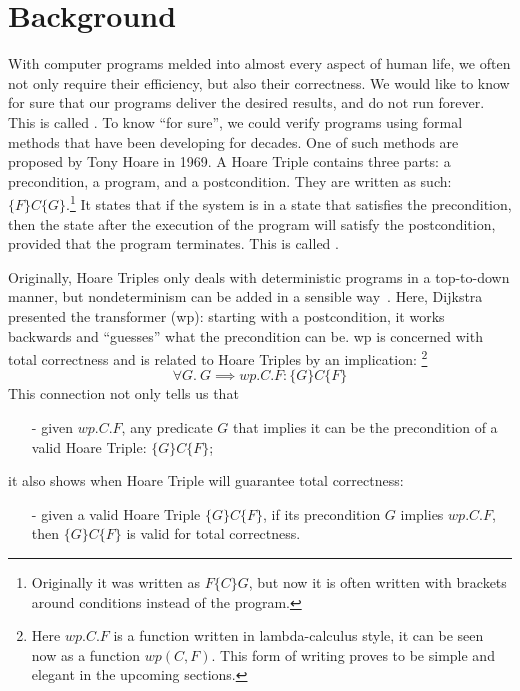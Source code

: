 \chapter{Background}\label{ch:background}

With computer programs melded into almost every aspect of human life, we often not only require their efficiency, but also their correctness. 
We would like to know for sure that our programs deliver the desired results, and do not run forever. 
This is called . 
To know ``for sure'', we could verify programs using formal methods that have been developing for decades. 
One of such methods are ~\cite{Hoare1969} proposed by Tony Hoare in 1969. 
A Hoare Triple contains three parts: a precondition, a program, and a postcondition. 
They are written as such: $\{F\}C\{G\}$.\footnote{Originally it was written as $F \{C\} G$, but now it is often written with brackets around conditions instead of the program.} 
It states that if the system is in a state that satisfies the precondition, then the state after the execution of the program will satisfy the postcondition, provided that the program terminates.
This is called . 

Originally, Hoare Triples only deals with deterministic programs in a top-to-down manner, but nondeterminism can be added in a sensible way~\cite{Dijkstra1975}. 
Here, Dijkstra presented the  transformer (wp): starting with a postcondition, it works backwards and ``guesses'' what the precondition can be. 
wp is concerned with total correctness and is related to Hoare Triples by an implication: 
\footnote{Here $wp.C.F$ is a function written in lambda-calculus style, it can be seen now as a function $wp(C,F)$. This form of writing proves to be simple and elegant in the upcoming sections.}
\[\forall G.\ G\implies wp.C.F: \{G\} C \{F\}\]
This connection not only tells us that 
\begin{itemize}
    \item[-] given $wp.C.F$, any predicate $G$ that implies it can be the precondition of a valid Hoare Triple: $\{G\} C \{F\}$; 
\end{itemize}
it also shows when Hoare Triple will guarantee total correctness: 
\begin{itemize}
    \item[-] given a valid Hoare Triple $\{G\} C \{F\}$, if its precondition $G$ implies $wp.C.F$, then $\{G\} C \{F\}$ is valid for total correctness. 
\end{itemize}


